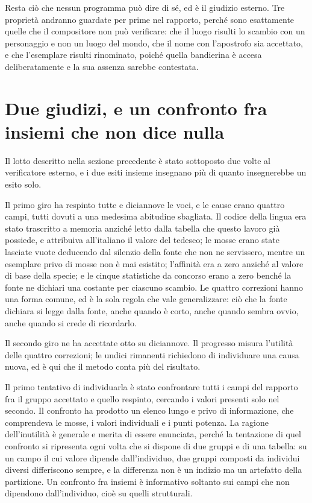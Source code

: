 Resta ciò che nessun programma può dire di sé, ed è il giudizio esterno. Tre proprietà andranno guardate per prime nel rapporto, perché sono esattamente quelle che il compositore non può verificare: che il luogo risulti lo scambio con un personaggio e non un luogo del mondo, che il nome con l'apostrofo sia accettato, e che l'esemplare risulti rinominato, poiché quella bandierina è accesa deliberatamente e la sua assenza sarebbe contestata.

\section{Due giudizi, e un confronto fra insiemi che non dice nulla}

Il lotto descritto nella sezione precedente è stato sottoposto due volte al verificatore esterno, e i due esiti insieme insegnano più di quanto insegnerebbe un esito solo.

Il primo giro ha respinto tutte e diciannove le voci, e le cause erano quattro campi, tutti dovuti a una medesima abitudine sbagliata. Il codice della lingua era stato trascritto a memoria anziché letto dalla tabella che questo lavoro già possiede, e attribuiva all'italiano il valore del tedesco; le mosse erano state lasciate vuote deducendo dal silenzio della fonte che non ne servissero, mentre un esemplare privo di mosse non è mai esistito; l'affinità era a zero anziché al valore di base della specie; e le cinque statistiche da concorso erano a zero benché la fonte ne dichiari una costante per ciascuno scambio. Le quattro correzioni hanno una forma comune, ed è la sola regola che vale generalizzare: ciò che la fonte dichiara si legge dalla fonte, anche quando è corto, anche quando sembra ovvio, anche quando si crede di ricordarlo.

Il secondo giro ne ha accettate otto su diciannove. Il progresso misura l'utilità delle quattro correzioni; le undici rimanenti richiedono di individuare una causa nuova, ed è qui che il metodo conta più del risultato.

Il primo tentativo di individuarla è stato confrontare tutti i campi del rapporto fra il gruppo accettato e quello respinto, cercando i valori presenti solo nel secondo. Il confronto ha prodotto un elenco lungo e privo di informazione, che comprendeva le mosse, i valori individuali e i punti potenza. La ragione dell'inutilità è generale e merita di essere enunciata, perché la tentazione di quel confronto si ripresenta ogni volta che si dispone di due gruppi e di una tabella: su un campo il cui valore dipende dall'individuo, due gruppi composti da individui diversi differiscono sempre, e la differenza non è un indizio ma un artefatto della partizione. Un confronto fra insiemi è informativo soltanto sui campi che non dipendono dall'individuo, cioè su quelli strutturali.


